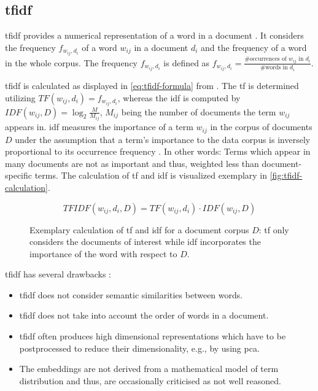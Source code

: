 \subsection{\acl*{tfidf}}\label{subsec:tfidf}

\ac{tfidf} provides a numerical representation of a word in a document \cite{clusteringDocs2020}.
It considers the frequency $f_{w_{ij}, d_i}$  of a word $w_{ij}$ in a document $d_i$ and the frequency of a word in the whole corpus. 
The frequency $f_{w_{ij}, d_i}$ is defined as $f_{w_{ij}, d_i} = \frac{\# \text{occurrences of } w_{ij} \text{ in }d_i}{\# \text{words in }d_i}$.

\ac{tfidf} is calculated as displayed in \autoref{eq:tfidf-formula} from \cite{clusteringDocs2020}.
The \ac{tf} is determined utilizing $TF(w_{ij}, d_i) = f_{w_{ij}, d_i}$, whereas the \ac{idf} is computed by $IDF(w_{ij}, D) = \log_2\frac{M}{M_{ij}}$, 
$M_{ij}$ being the number of documents the term $w_{ij}$ appears in.
\ac{idf} measures the importance of a term $w_{ij}$ in the corpus of documents $D$
under the assumption that a term's importance to the data corpus is inversely proportional to its occurrence frequency \cite{tfidf2008}.
In other words: Terms which appear in many documents are not as important and thus, weighted less than document-specific terms. 
The calculation of \ac{tf} and \ac{idf} is visualized exemplary in \autoref{fig:tfidf-calculation}.

\begin{equation}
    TFIDF(w_{ij}, d_i, D) = TF(w_{ij}, d_i) \cdot IDF(w_{ij}, D)
    \label{eq:tfidf-formula}
\end{equation}


\begin{figure}[!htb] %
    \centering
    
    \caption[Exemplary calculation of \ac{tf} and \ac{idf} values]{
        Exemplary calculation of \ac{tf} and \ac{idf} for a document corpus $D$: 
        \ac{tf} only considers the documents of interest while 
        \ac{idf} incorporates the importance of the word with respect to $D$.
    }
    \label{fig:tfidf-calculation}
\end{figure}

\ac{tfidf} has several drawbacks \cite{clusteringDocs2020,tfidf2008}:
\begin{itemize}
    \item \ac{tfidf} does not consider semantic similarities between words.
    \item \ac{tfidf} does not take into account the order of words in a document.
    \item \ac{tfidf} often produces high dimensional representations which have to be postprocessed to reduce their dimensionality, e.g., by using \ac{pca}.
    \item The embeddings are not derived from a mathematical model of term distribution and thus, are occasionally criticised as not well reasoned.
\end{itemize}
